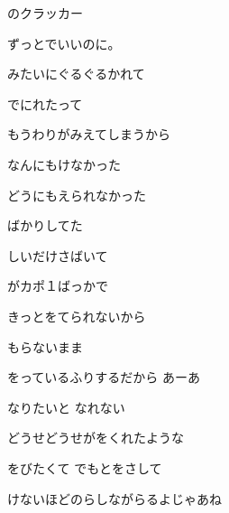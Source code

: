 \documentclass[a4paper,tate,twocolumn,12pt]{ltjtarticle}
\begin{document}
\thispagestyle{empty}

\begin{center}
{\LARGE {}のクラッカー}

{\large ずっとでいいのに。}
\end{center}

\vspace{1em}

\begin{flushleft}

\noindent\begin{minipage}{\linewidth}
みたいにぐるぐるかれて

でにれたって

もうわりがみえてしまうから

なんにもけなかった

どうにもえられなかった

ばかりしてた
\end{minipage}

\vspace{2em}

\noindent\begin{minipage}{\linewidth}
しいだけさばいて

がカポ１ばっかで

きっとをてられないから

もらないまま

をっているふりするだから あーあ
\end{minipage}

\vspace{2em}

\noindent\begin{minipage}{\linewidth}
なりたいと なれない

どうせどうせがをくれたような

をびたくて でもとをさして

けないほどのらしながらるよじゃあね
\end{minipage}


\end{flushleft}
\end{document}
